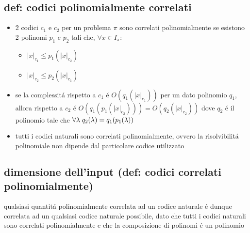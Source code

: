 \subsection*{def: codici polinomialmente correlati}
\begin{flushleft}
	\begin{itemize}
		\item 2 codici $c_1$ e $c_2$ per un problema $\pi$ sono correlati polinomialmente se esistono 2 polinomi $p_1$ e $p_2$ tali che, $\forall x\in I_{\pi}$:
		\begin{itemize}
			\item $|x|_{c_1}\leq p_1(|x|_{c_2})$
			\item $|x|_{c_2}\leq p_2(|x|_{c_1})$
		\end{itemize}
	\item se la complessit\'a rispetto a $c_1$ \'e $O(q_1(|x|_{c_1}))$ per un dato polinomio $q_1$, allora rispetto a $c_2$ \'e $O(q_1(p_1(|x|_{c_2})))=O(q_2(|x|_{c_2}))$ dove $q_2$ \'e il polinomio tale che $\forall\lambda\hspace{0.1cm}q_2(\lambda)=q_1(p_1(\lambda))$
	\item tutti i codici naturali sono correlati polinomialmente, ovvero la risolvibilit\'a polinomiale non dipende dal particolare codice utilizzato
	\end{itemize}
\end{flushleft}


\subsection*{dimensione dell'input (def: codici correlati polinomialmente)}
\begin{flushleft}
	qualsiasi quantit\'a polinomialmente correlata ad un codice naturale \'e dunque correlata ad un qualsiasi codice naturale possibile, dato che tutti i codici naturali sono correlati polinomialmente e che la composizione di polinomi \'e un polinomio
\end{flushleft}


